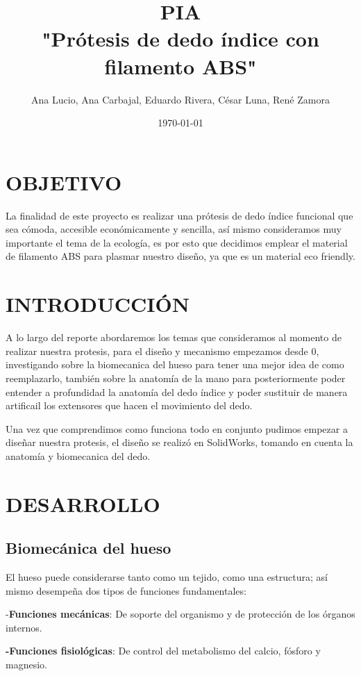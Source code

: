 \documentclass{article}
\author{Ana Lucio,
Ana Carbajal,
Eduardo Rivera,
César Luna,
René Zamora} %
\title{PIA\\ "Prótesis de dedo índice con filamento ABS"} %
\date{\today}
\begin{document}

\maketitle %


\section{OBJETIVO}
La finalidad de este proyecto es realizar una prótesis de dedo índice funcional que sea cómoda, accesible económicamente y sencilla, así mismo consideramos muy importante el tema de la ecología, es por esto que decidimos emplear el material de filamento ABS para plasmar nuestro diseño, ya que es un material eco friendly.


\section{INTRODUCCIÓN}
A lo largo del reporte abordaremos los temas que consideramos al momento de realizar nuestra protesis, para el diseño y mecanismo empezamos desde 0, investigando sobre la biomecanica del hueso para tener una mejor idea de como reemplazarlo, también sobre la anatomía de la mano para posteriormente poder entender a profundidad la anatomía del dedo índice y poder sustituir de manera artificail los extensores que hacen el movimiento del dedo. 

Una vez que comprendimos como funciona todo en conjunto pudimos empezar a diseñar nuestra protesis, el diseño se realizó en SolidWorks, tomando en cuenta la anatomía y biomecanica del dedo.

\section{DESARROLLO}

\subsection{\textbf{Biomecánica del hueso}}

El hueso puede considerarse tanto como un tejido, como una estructura; así mismo desempeña dos tipos de funciones fundamentales:

-\textbf{Funciones mecánicas}: De soporte del organismo y de protección de los órganos internos.

\textbf{-Funciones fisiológicas}: De control del metabolismo del calcio, fósforo y magnesio.
\end{document}
